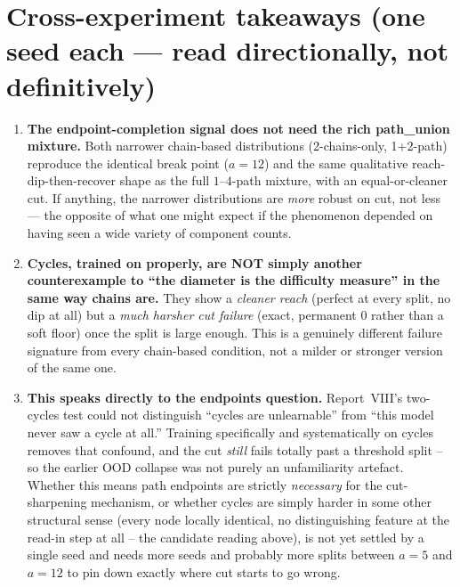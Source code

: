 \documentclass[11pt,a4paper]{article}
\begin{document}
\clearpage
\section*{Cross-experiment takeaways (one seed each --- read directionally, not definitively)}

\begin{enumerate}\setlength\itemsep{0.2em}
  \item \textbf{The endpoint-completion signal does not need the rich path\_union mixture.} Both
        narrower chain-based distributions (2-chains-only, 1+2-path) reproduce the identical
        break point ($a=12$) and the same qualitative reach-dip-then-recover shape as the full
        $1$--$4$-path mixture, with an equal-or-cleaner cut. If anything, the narrower
        distributions are \emph{more} robust on cut, not less --- the opposite of what one might
        expect if the phenomenon depended on having seen a wide variety of component counts.
  \item \textbf{Cycles, trained on properly, are NOT simply another counterexample to ``the
        diameter is the difficulty measure'' in the same way chains are.} They show a
        \emph{cleaner reach} (perfect at every split, no dip at all) but a \emph{much harsher cut
        failure} (exact, permanent $0$ rather than a soft floor) once the split is large enough.
        This is a genuinely different failure signature from every chain-based condition, not a
        milder or stronger version of the same one.
  \item \textbf{This speaks directly to the endpoints question.} Report~VIII's two-cycles test
        could not distinguish ``cycles are unlearnable'' from ``this model never saw a cycle at
        all.'' Training specifically and systematically on cycles removes that confound, and the
        cut \emph{still} fails totally past a threshold split -- so the earlier OOD collapse was
        not purely an unfamiliarity artefact. Whether this means path endpoints are strictly
        \emph{necessary} for the cut-sharpening mechanism, or whether cycles are simply harder in
        some other structural sense (every node locally identical, no distinguishing feature at
        the read-in step at all -- the candidate reading above), is not yet settled by a single
        seed and needs more seeds and probably more splits between $a=5$ and $a=12$ to pin down
        exactly where cut starts to go wrong.
\end{enumerate}
\end{document}
